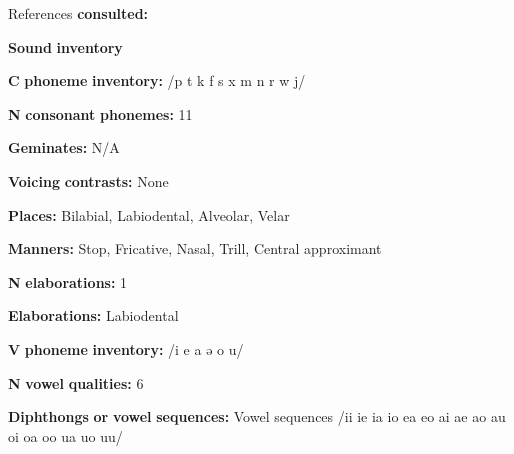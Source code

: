 \begin{styleBody}
References \textbf{consulted:} \citet{Dol2007}
\end{styleBody}

\begin{styleBody}
\textbf{Sound} \textbf{inventory}
\end{styleBody}

\begin{styleBody}
\textbf{C} \textbf{phoneme} \textbf{inventory:} /p t k f s x m n r w j/
\end{styleBody}

\begin{styleBody}
\textbf{N} \textbf{consonant} \textbf{phonemes:} 11
\end{styleBody}

\begin{styleBody}
\textbf{Geminates:} N/A
\end{styleBody}

\begin{styleBody}
\textbf{Voicing} \textbf{contrasts:} None
\end{styleBody}

\begin{styleBody}
\textbf{Places:} Bilabial, Labiodental, Alveolar, Velar
\end{styleBody}

\begin{styleBody}
\textbf{Manners:} Stop, Fricative, Nasal, Trill, Central approximant
\end{styleBody}

\begin{styleBody}
\textbf{N} \textbf{elaborations:} 1
\end{styleBody}

\begin{styleBody}
\textbf{Elaborations:} Labiodental
\end{styleBody}

\begin{styleBody}
\textbf{V} \textbf{phoneme} \textbf{inventory:} /i e a ə o u/
\end{styleBody}

\begin{styleBody}
\textbf{N} \textbf{vowel} \textbf{qualities:} 6
\end{styleBody}

\begin{styleBody}
\textbf{Diphthongs} \textbf{or} \textbf{vowel} \textbf{sequences:} Vowel sequences /ii ie ia io ea eo ai ae ao au oi oa oo ua uo uu/
\end{styleBody}

